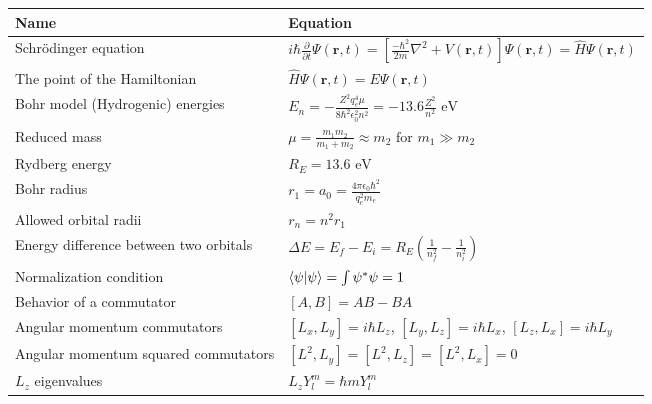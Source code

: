 \documentclass[11pt]{paper}
\begin{document}
\label{my-label}
\bgroup
\def\arraystretch{2}
\begin{longtable}{ll}
\textbf{Name}       & \textbf{Equation}          \\ \hline
\multicolumn{1}{|l|}{Schr\"{o}dinger equation} & \multicolumn{1}{l|}{$i\hbar \frac{\partial}{\partial t}\Psi\left(\mathbf{r},t\right) = \left[\frac{-\hbar^2}{2m}\nabla^2 + V\left(\mathbf{r},t\right)\right]\Psi\left(\mathbf{r},t\right) = \hat{H}\Psi\left(\mathbf{r},t\right)$} \\ \hline
\multicolumn{1}{|l|}{The point of the Hamiltonian} & \multicolumn{1}{l|}{$\hat{H}\Psi\left(\mathbf{r},t\right) = E\Psi\left(\mathbf{r},t\right)$} \\ \hline
\multicolumn{1}{|l|}{Bohr model (Hydrogenic) energies} & \multicolumn{1}{l|}{$E_n = -\frac{Z^2q_e^4 \mu}{8\hbar^2\epsilon_0^2 n^2} = -13.6\frac{Z^2}{n^2}\text{ eV}$} \\ \hline
\multicolumn{1}{|l|}{Reduced mass} & \multicolumn{1}{l|}{$\mu = \frac{m_1 m_2}{m_1+m_2}\approx m_2 \text{ for } m_1 \gg m_2$} \\ \hline
\multicolumn{1}{|l|}{Rydberg energy} & \multicolumn{1}{l|}{$R_E = 13.6\text{ eV}$} \\ \hline
\multicolumn{1}{|l|}{Bohr radius} & \multicolumn{1}{l|}{$r_1 = a_0 = \frac{4\pi\epsilon_0\hbar^2}{q_e^2m_e}$} \\ \hline
\multicolumn{1}{|l|}{Allowed orbital radii} & \multicolumn{1}{l|}{$r_n = n^2 r_1$} \\ \hline
\multicolumn{1}{|l|}{Energy difference between two orbitals} & \multicolumn{1}{l|}{$\Delta E = E_f - E_i = R_E\left(\frac{1}{n_f^2}-\frac{1}{n_i^2}\right)$} \\ \hline
\multicolumn{1}{|l|}{Normalization condition} & \multicolumn{1}{l|}{$\bra{\psi}\ket{\psi} = \int\psi^*\psi = 1$} \\ \hline
\multicolumn{1}{|l|}{Behavior of a commutator} & \multicolumn{1}{l|}{$\left[A,B\right] = AB-BA$} \\ \hline
\multicolumn{1}{|l|}{Angular momentum commutators} & \multicolumn{1}{l|}{$\left[L_x,L_y\right] = i\hbar L_z$, $\left[L_y,L_z\right] = i\hbar L_x$, $\left[L_z,L_x\right] = i\hbar L_y$} \\ \hline
\multicolumn{1}{|l|}{Angular momentum squared commutators} & \multicolumn{1}{l|}{$\left[L^2,L_y\right] = \left[L^2,L_z\right] = \left[L^2,L_x\right] = 0$} \\ \hline
\multicolumn{1}{|l|}{$L_z$ eigenvalues} & \multicolumn{1}{l|}{$L_z Y_l^m = \hbar m Y_l^m$} \\ \hline

\end{longtable}
\end{document}
